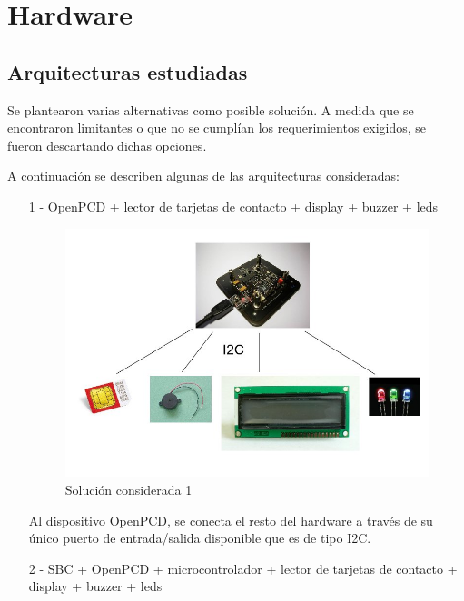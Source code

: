 \chapter{Hardware}

\section{Arquitecturas estudiadas}
Se plantearon varias alternativas como posible solución. A medida que se encontraron limitantes o que no se cumplían los requerimientos exigidos, se fueron descartando dichas opciones.

A continuación se describen algunas de las arquitecturas consideradas:

\begin{itemize}
\item[1 -] OpenPCD + lector de tarjetas de contacto + display + buzzer + leds
\bigskip

\begin{figure}[H]
\centering
  \begin{center}
  \includegraphics[scale=.4]{Imagenes/0.jpg} 
  \end{center}
  \caption{Solución considerada 1}\label{Fig:HW1} 
\end{figure}

\newpage
Al dispositivo OpenPCD, se conecta el resto del hardware a través de su único puerto de entrada/salida disponible que es de tipo I2C.

\bigskip
\bigskip
\item[2 -] SBC + OpenPCD + microcontrolador + lector de tarjetas de contacto + display + buzzer + leds
\bigskip


\end{itemize}
